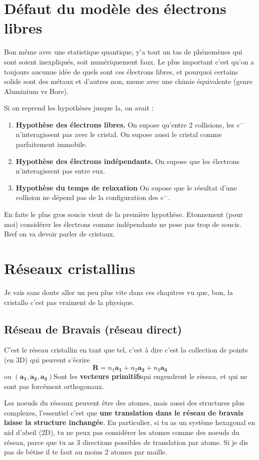 \documentclass[a4paper]{report}
\begin{document}
  \chapter{Défaut du modèle des électrons libres}
  
  Bon même avec une statistique quantique, y'a tout un tas de phénomènes qui sont soient inexpliqués, soit numériquement faux. Le plus important c'est qu'on a toujours aucunue idée de quels sont ces électrons libres, et pourquoi certains solide sont des métaux et d'autres non, meme avec une chimie équivalente (genre Aluminium vs Bore).
  
  Si on reprend les hypothèses jusque la, on avait :
  \begin{enumerate}
  \item \textbf{Hypothèse des électrons libres.} On supose qu'entre 2 collisions, les $e^-$ n'interagissent pas avec le cristal. On supose aussi le cristal comme parfaitement immobile.
  \item \textbf{Hypothèse des électrons indépendants.} On supose que les électrons n'interagissent pas entre eux.
  \item \textbf{Hypothèse du temps de relaxation} On supose que le résultat d'une collision ne dépend pas de la configuration des $e^-$.
  \end{enumerate}
  
  En faite le plus gros soucis vient de la première hypothèse. Etonnement (pour moi) considérer les électrons comme indépendants ne pose pas trop de soucis. Bref on va devoir parler de cristaux.
  
  \chapter{Réseaux cristallins}
  Je vais sans doute aller un peu plus vite dans ces chapitres vu que, bon, la cristallo c'est pas vraiment de la physique.
  \section{Réseau de Bravais (réseau direct)}
  C'est le réseau cristallin en tant que tel, c'est à dire c'est la collection de points (en 3D) qui peuvent s'écrire $$\mathbf{R}=n_1 \mathbf{a_1}+n_2 \mathbf{a_2}+n_3 \mathbf{a_3}$$ ou $(\mathbf{a_1},\mathbf{a_2},\mathbf{a_3})$Sont les \textbf{vecteurs primitifs}qui engendrent le réseau, et qui ne sont pas forcément orthogonaux.
  
  Les noeuds du réseaux peuvent être des atomes, mais aussi des structures plus complexes, l'essentiel c'est que \textbf{une translation dans le réseau de bravais laisse la structure inchangée}. En particulier, si tu as un système hexagonal en nid d'abeil (2D), tu ne peux pas considérer les atomes comme des noeuds du réseau, parce que tu as 3 directions possibles de translation par atome. Si je dis pas de bétise il te faut au moins 2 atomes par maille.
\end{document}
